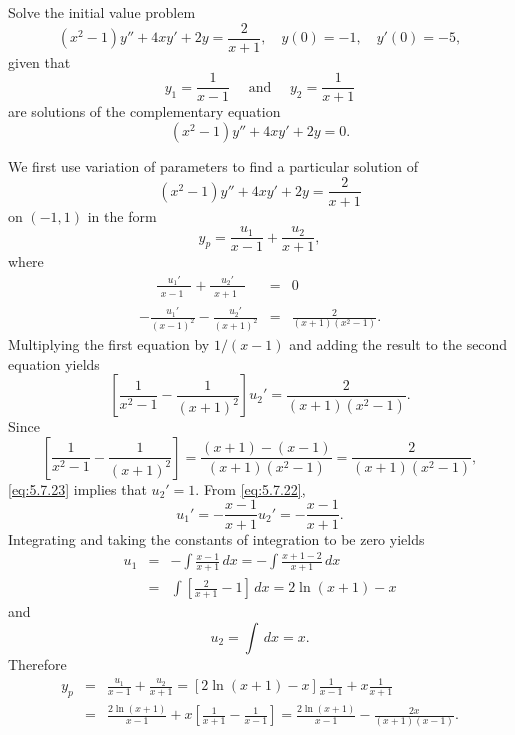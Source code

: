 \setcounter{example}{3}
\setcounter{equation}{20}
\begin{example}
  \label{example:5.7.4} \rm Solve the initial value problem
  \begin{equation}
    \label{eq:5.7.21}(x^{2}-1)y''+4xy'+2y=\frac{2}{x+1},\quad y(0)=-1,\quad y'(0)=-5,
  \end{equation}
  given that
  \[
    y_{1}=\frac{1}{x-1}\quad\mbox{ and }\quad y_{2}=\frac{1}{x+1}
  \]
  are solutions of the complementary equation
  \[
    (x^{2}-1)y''+4xy'+2y=0.
  \]
\end{example}
\setcounter{equation}{21}
\setcounter{figure}{0}
\begin{examplesolution}
\solution We first use variation of parameters to find a particular solution of
\[
  (x^{2}-1)y''+4xy'+2y=\frac{2}{x+1}
\]
on $(-1,1)$ in the form
\[
  y_{p}=\frac{u_{1}}{x-1}+\frac{u_{2}}{x+1},
\]
where
\begin{eqnarray}
  \phantom{-}{\frac{u_{1}'}{\phantom{(}x-1\phantom{)^{2}}}}+\frac{u_{2}'}{\phantom{(}x+1\phantom{)^{2}}} & = & 0\label{eq:5.7.22} \\
  -\frac{u_{1}'}{(x-1)^{2}}-\frac{u_{2}'}{(x+1)^{2}}                                                     & = & \frac{2}{(x+1)(x^{2}-1)}.\nonumber
\end{eqnarray}
Multiplying the first equation by $1/(x-1)$ and adding the result to the second equation yields
\begin{equation}
  \label{eq:5.7.23}\left[\frac{1}{x^{2}-1}-\frac{1}{(x+1)^{2}}\right]u_{2}'=\frac{2}{(x+1)(x^{2}-1)}.
\end{equation}
Since
\[
  \left[\frac{1}{x^{2}-1}-\frac{1}{(x+1)^{2}}\right]=\frac{(x+1)-(x-1)}{(x+1)(x^{2}-1)}=\frac{2}{(x+1)(x^{2}-1)},
\]
\eqref{eq:5.7.23} implies that $u_{2}'=1$. From \eqref{eq:5.7.22},
\[
  u_{1}'=-\frac{x-1}{x+1}u_{2}'=-\frac{x-1}{x+1}.
\]
Integrating and taking the constants of integration to be zero yields
\begin{eqnarray*}
  u_{1} & = & -\int\frac{x-1}{x+1}\,dx=-\int\frac{x+1-2}{x+1}\,dx \\
        & = & \int\left[\frac{2}{x+1}-1\right]\,dx=2\ln(x+1)-x
\end{eqnarray*}
and
\[
  u_{2}=\int\,dx=x.
\]
Therefore
\begin{eqnarray*}
  y_{p} & = & \frac{u_{1}}{x-1}+\frac{u_{2}}{x+1}=\left[2\ln(x+1)-x\right]{\frac{1}{x-1}}+x\frac{1}{x+1} \\
        & = & \frac{2\ln(x+1)}{x-1}+x\left[\frac{1}{x+1}-\frac{1}{x-1}\right]=\frac{2\ln(x+1)}{x-1}-\frac{2x}{(x+1)(x-1)}.

\end{eqnarray*}
\end{examplesolution}

